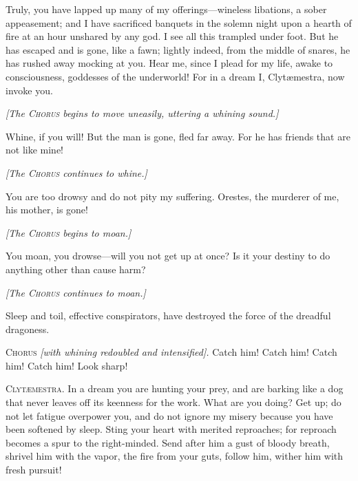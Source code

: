 \documentclass[12pt]{article}
\begin{document}
Truly, you have lapped up many of my offerings---wineless libations, a sober appeasement; and I have sacrificed banquets in the solemn night upon a hearth of fire at an hour unshared by any god. I see all this trampled under foot. But he has escaped and is gone, like a fawn; lightly indeed, from the middle of snares, he has rushed away mocking at you. Hear me, since I plead for my life, awake to consciousness, goddesses of the underworld! For in a dream I, Clyt{\ae}mestra, now invoke you.

\begin{center}
\textit{[The \textsc{Chorus} begins to move uneasily, uttering a whining sound.]}
\end{center}

Whine, if you will! But the man is gone, fled far away. For he has friends that are not like mine!

\begin{center}
\textit{[The \textsc{Chorus} continues to whine.]}
\end{center}

You are too drowsy and do not pity my suffering. Orestes, the murderer of me, his mother, is gone!

\begin{center}
\textit{[The \textsc{Chorus} begins to moan.]}
\end{center}

You moan, you drowse---will you not get up at once? Is it your destiny to do anything other than cause harm?

\begin{center}
\textit{[The \textsc{Chorus} continues to moan.]}
\end{center}

Sleep and toil, effective conspirators, have destroyed the force of the dreadful dragoness.

\textsc{Chorus} \textit{[with whining redoubled and intensified].} Catch him! Catch him! Catch him! Catch him! Look sharp!

\textsc{Clyt{\ae}mestra.} In a dream you are hunting your prey, and are barking like a dog that never leaves off its keenness for the work. What are you doing? Get up; do not let fatigue overpower you, and do not ignore my misery because you have been softened by sleep. Sting your heart with merited reproaches; for reproach becomes a spur to the right-minded. Send after him a gust of bloody breath, shrivel him with the vapor, the fire from your guts, follow him, wither him with fresh pursuit!
\end{document}
